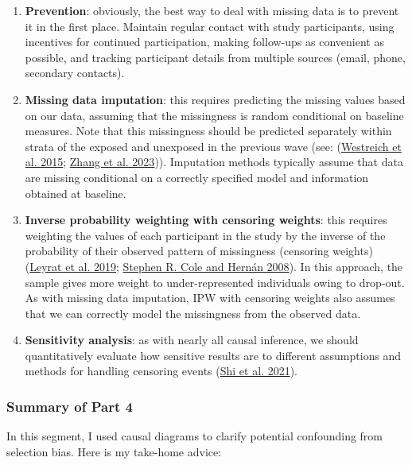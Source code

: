 \documentclass[
  singlecolumn]{article}
\begin{document}
\begin{enumerate}
\def\labelenumi{\arabic{enumi}.}
\item
  \textbf{Prevention}: obviously, the best way to deal with missing data
  is to prevent it in the first place. Maintain regular contact with
  study participants, using incentives for continued participation,
  making follow-ups as convenient as possible, and tracking participant
  details from multiple sources (email, phone, secondary contacts).
\item
  \textbf{Missing data imputation}: this requires predicting the missing
  values based on our data, assuming that the missingness is random
  conditional on baseline measures. Note that this missingness should be
  predicted separately within strata of the exposed and unexposed in the
  previous wave (see: (\protect\hyperlink{ref-westreich2015}{Westreich
  et al. 2015}; \protect\hyperlink{ref-zhang2023}{Zhang et al. 2023})).
  Imputation methods typically assume that data are missing conditional
  on a correctly specified model and information obtained at baseline.
\item
  \textbf{Inverse probability weighting with censoring weights}: this
  requires weighting the values of each participant in the study by the
  inverse of the probability of their observed pattern of missingness
  (censoring weights)(\protect\hyperlink{ref-leyrat2019}{Leyrat et al.
  2019}; \protect\hyperlink{ref-cole2008}{Stephen R. Cole and Hernán
  2008}). In this approach, the sample gives more weight to
  under-represented individuals owing to drop-out. As with missing data
  imputation, IPW with censoring weights also assumes that we can
  correctly model the missingness from the observed data.
\item
  \textbf{Sensitivity analysis}: as with nearly all causal inference, we
  should quantitatively evaluate how sensitive results are to different
  assumptions and methods for handling censoring events
  (\protect\hyperlink{ref-shi2021}{Shi et al. 2021}).
\end{enumerate}

\hypertarget{summary-of-part-4}{%
\subsubsection{Summary of Part 4}\label{summary-of-part-4}}

In this segment, I used causal diagrams to clarify potential confounding
from selection bias. Here is my take-home advice:
\end{document}

